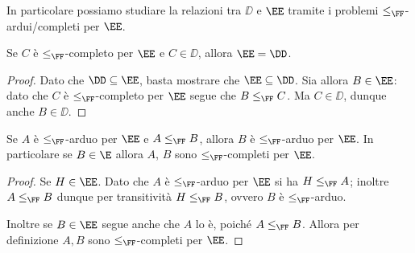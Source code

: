 In particolare possiamo studiare la relazioni tra $\DD$ e $\EE$ tramite i problemi $\leq_{\FF}$-ardui/completi per $\EE$.

\begin{proposition}
    Se $C$ è $\leq_{\FF}$-completo per $\EE$ e $C \in \DD$, allora $\EE = \DD$.    
\end{proposition}
\begin{proof}
    Dato che $\DD \subseteq \EE$, basta mostrare che $\EE \subseteq \DD$. Sia allora $B \in \EE$: dato che $C$ è $\leq_{\FF}$-completo per $\EE$ segue che $B \leq_{\FF} C$. Ma $C \in \DD$, dunque anche $B \in \DD$.      
\end{proof}

\begin{proposition}[ ][A-hard=>B-hard]
    Se $A$ è $\leq_{\FF}$-arduo per $\EE$ e $A \leq_{\FF} B$, allora $B$ è $\leq_{\FF}$-arduo per $\EE$. In particolare se $B \in \E$ allora $A$, $B$ sono $\leq_{\FF}$-completi per $\EE$.          
\end{proposition}
\begin{proof}
    Se $H \in \EE$. Dato che $A$ è $\leq_{\FF}$-arduo per $\EE$ si ha $H \leq_{\FF} A$; inoltre $A \leq_{\FF} B$ dunque per transitività $H \leq_{\FF} B$, ovvero $B$ è $\leq_{\FF}$-arduo.
    
    Inoltre se $B \in \EE$ segue anche che $A$ lo è, poiché $A \leq_{\FF} B$. Allora per definizione $A, B$ sono $\leq_{\FF}$-completi per $\EE$.
\end{proof}